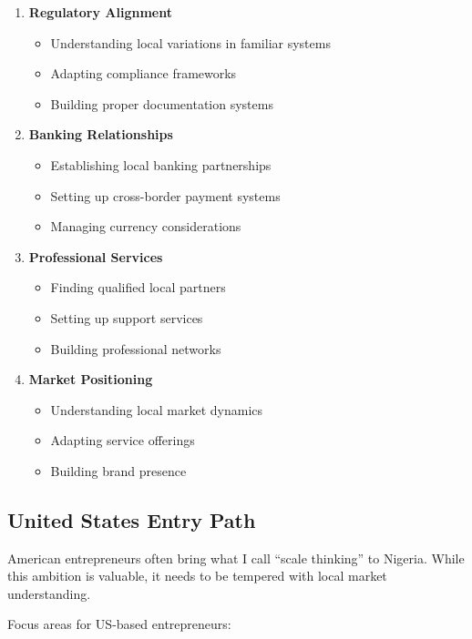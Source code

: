 \begin{enumerate}
    \item \textbf{Regulatory Alignment}
    \begin{itemize}
        \item Understanding local variations in familiar systems
        \item Adapting compliance frameworks
        \item Building proper documentation systems
    \end{itemize}
    \item \textbf{Banking Relationships}
    \begin{itemize}
        \item Establishing local banking partnerships
        \item Setting up cross-border payment systems
        \item Managing currency considerations
    \end{itemize}
    \item \textbf{Professional Services}
    \begin{itemize}
        \item Finding qualified local partners
        \item Setting up support services
        \item Building professional networks
    \end{itemize}
    \item \textbf{Market Positioning}
    \begin{itemize}
        \item Understanding local market dynamics
        \item Adapting service offerings
        \item Building brand presence
    \end{itemize}
\end{enumerate}

\subsection{United States Entry Path}\label{subsec:united-states-entry-path}

American entrepreneurs often bring what I call ``scale thinking'' to Nigeria. While this ambition is valuable, it needs to be tempered with local market understanding.

Focus areas for US-based entrepreneurs:

